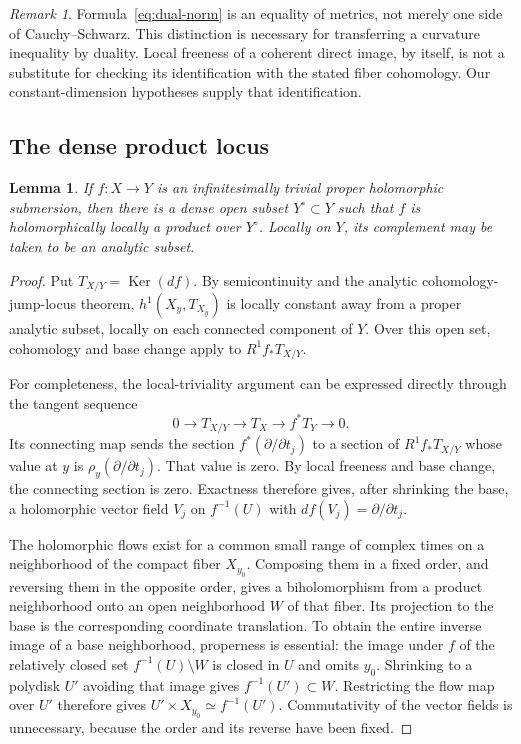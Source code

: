 \documentclass[11pt,reqno]{amsart}
\numberwithin{equation}{section}
\newtheorem{lemma}[theorem]{Lemma}
\theoremstyle{definition}
\theoremstyle{remark}
\newtheorem{remark}[theorem]{Remark}
\newcommand{\Ker}{\operatorname{Ker}}
\begin{document}
\begin{remark}
Formula~\eqref{eq:dual-norm} is an equality of metrics, not merely one side of Cauchy--Schwarz. This distinction is necessary for transferring a curvature inequality by duality. Local freeness of a coherent direct image, by itself, is not a substitute for checking its identification with the stated fiber cohomology. Our constant-dimension hypotheses supply that identification.
\end{remark}


\subsection{The dense product locus}
\begin{lemma}\label{lem:product}
If $f:X\to Y$ is an infinitesimally trivial proper holomorphic submersion, then there is a dense open subset $Y^\circ\subset Y$ such that $f$ is holomorphically locally a product over $Y^\circ$. Locally on $Y$, its complement may be taken to be an analytic subset.
\end{lemma}
\begin{proof}
Put $T_{X/Y}=\Ker(df)$. By semicontinuity and the analytic cohomology-jump-locus theorem, $h^1(X_y,T_{X_y})$ is locally constant away from a proper analytic subset, locally on each connected component of $Y$. Over this open set, cohomology and base change apply to $R^1f_*T_{X/Y}$.

For completeness, the local-triviality argument can be expressed directly through the tangent sequence
\[
 0\longrightarrow T_{X/Y}\longrightarrow T_X
 \longrightarrow f^*T_Y\longrightarrow0.
\]
Its connecting map sends the section $f^*(\partial/\partial t_j)$ to a section of $R^1f_*T_{X/Y}$ whose value at $y$ is $\rho_y(\partial/\partial t_j)$. That value is zero. By local freeness and base change, the connecting section is zero. Exactness therefore gives, after shrinking the base, a holomorphic vector field $V_j$ on $f^{-1}(U)$ with $df(V_j)=\partial/\partial t_j$.

The holomorphic flows exist for a common small range of complex times on a neighborhood of the compact fiber $X_{y_0}$. Composing them in a fixed order, and reversing them in the opposite order, gives a biholomorphism from a product neighborhood onto an open neighborhood $W$ of that fiber. Its projection to the base is the corresponding coordinate translation. To obtain the entire inverse image of a base neighborhood, properness is essential: the image under $f$ of the relatively closed set $f^{-1}(U)\setminus W$ is closed in $U$ and omits $y_0$. Shrinking to a polydisk $U'$ avoiding that image gives $f^{-1}(U')\subset W$. Restricting the flow map over $U'$ therefore gives $U'\times X_{y_0}\simeq f^{-1}(U')$. Commutativity of the vector fields is unnecessary, because the order and its reverse have been fixed.
\end{proof}
\end{document}
